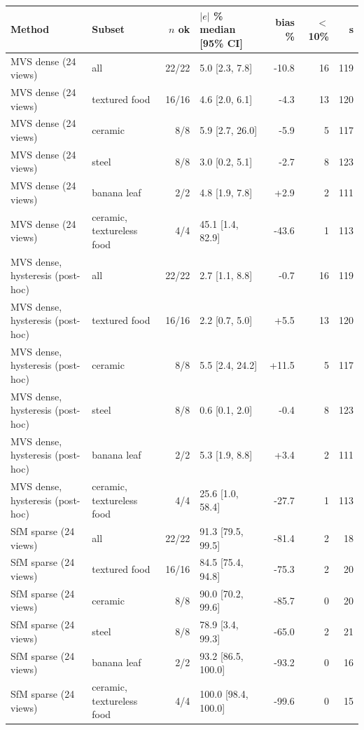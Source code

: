 \begin{tabular}{llrlrrr}\toprule
Method & Subset & $n$ ok & $|e|$ \% median [95\% CI] & bias \% & $<$10\% & s \\
\midrule
MVS dense (24 views) & all & 22/22 & 5.0 [2.3, 7.8] & -10.8 & 16 & 119 \\
MVS dense (24 views) & textured food & 16/16 & 4.6 [2.0, 6.1] & -4.3 & 13 & 120 \\
MVS dense (24 views) & ceramic & 8/8 & 5.9 [2.7, 26.0] & -5.9 & 5 & 117 \\
MVS dense (24 views) & steel & 8/8 & 3.0 [0.2, 5.1] & -2.7 & 8 & 123 \\
MVS dense (24 views) & banana leaf & 2/2 & 4.8 [1.9, 7.8] & +2.9 & 2 & 111 \\
MVS dense (24 views) & ceramic, textureless food & 4/4 & 45.1 [1.4, 82.9] & -43.6 & 1 & 113 \\
MVS dense, hysteresis (post-hoc) & all & 22/22 & 2.7 [1.1, 8.8] & -0.7 & 16 & 119 \\
MVS dense, hysteresis (post-hoc) & textured food & 16/16 & 2.2 [0.7, 5.0] & +5.5 & 13 & 120 \\
MVS dense, hysteresis (post-hoc) & ceramic & 8/8 & 5.5 [2.4, 24.2] & +11.5 & 5 & 117 \\
MVS dense, hysteresis (post-hoc) & steel & 8/8 & 0.6 [0.1, 2.0] & -0.4 & 8 & 123 \\
MVS dense, hysteresis (post-hoc) & banana leaf & 2/2 & 5.3 [1.9, 8.8] & +3.4 & 2 & 111 \\
MVS dense, hysteresis (post-hoc) & ceramic, textureless food & 4/4 & 25.6 [1.0, 58.4] & -27.7 & 1 & 113 \\
SfM sparse (24 views) & all & 22/22 & 91.3 [79.5, 99.5] & -81.4 & 2 & 18 \\
SfM sparse (24 views) & textured food & 16/16 & 84.5 [75.4, 94.8] & -75.3 & 2 & 20 \\
SfM sparse (24 views) & ceramic & 8/8 & 90.0 [70.2, 99.6] & -85.7 & 0 & 20 \\
SfM sparse (24 views) & steel & 8/8 & 78.9 [3.4, 99.3] & -65.0 & 2 & 21 \\
SfM sparse (24 views) & banana leaf & 2/2 & 93.2 [86.5, 100.0] & -93.2 & 0 & 16 \\
SfM sparse (24 views) & ceramic, textureless food & 4/4 & 100.0 [98.4, 100.0] & -99.6 & 0 & 15 \\
\bottomrule
\end{tabular}
